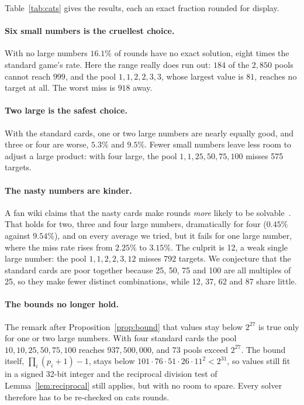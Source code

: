 \documentclass[11pt,a4paper]{article}
\theoremstyle{definition}
\theoremstyle{remark}
\begin{document}
Table~\ref{tab:cats} gives the results, each an exact fraction rounded for display.

\paragraph{Six small numbers is the cruellest choice.}
With no large numbers $16.1\%$ of rounds have no exact solution, eight times the standard game's rate. Here
the range really does run out: $184$ of the $2{,}850$ pools cannot reach $999$, and the pool
$1, 1, 2, 2, 3, 3$, whose largest value is $81$, reaches no target at all. The worst miss is $918$ away.

\paragraph{Two large is the safest choice.}
With the standard cards, one or two large numbers are nearly equally good, and three or four are worse,
$5.3\%$ and $9.5\%$. Fewer small numbers leave less room to adjust a large product: with four large, the pool
$1, 1, 25, 50, 75, 100$ misses 575 targets.

\paragraph{The nasty numbers are kinder.}
A fan wiki claims that the nasty cards make rounds \emph{more} likely to be solvable~\cite{apterous}. That
holds for two, three and four large numbers, dramatically for four ($0.45\%$ against $9.54\%$), and on every
average we tried, but it fails for one large number, where the miss rate rises from $2.25\%$ to $3.15\%$.
The culprit is 12, a weak single large number: the pool $1, 1, 2, 2, 3, 12$ misses 792 targets. We
conjecture that the standard cards are poor together because 25, 50, 75 and 100 are all multiples of 25,
so they make fewer distinct combinations, while 12, 37, 62 and 87 share little.

\paragraph{The bounds no longer hold.}
The remark after Proposition~\ref{prop:bound} that values stay below $2^{27}$ is true only for one or two
large numbers. With four standard cards the pool $10, 10, 25, 50, 75, 100$ reaches $937{,}500{,}000$, and
73 pools exceed $2^{27}$. The bound itself, $\prod_i (p_i + 1) - 1$, stays below
$101 \cdot 76 \cdot 51 \cdot 26 \cdot 11^2 < 2^{31}$, so values still fit in a signed 32-bit integer and the
reciprocal division test of Lemma~\ref{lem:reciprocal} still applies, but with no room to spare. Every
solver therefore has to be re-checked on cats rounds.
\end{document}
